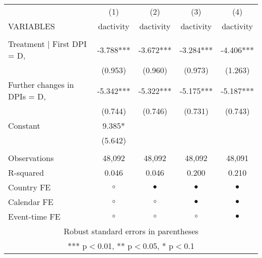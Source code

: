 \begin{tabular}{lcccc} \hline
 & (1) & (2) & (3) & (4) \\
VARIABLES & dactivity & dactivity & dactivity & dactivity \\ \hline
 &  &  &  &  \\
Treatment | First DPI = D, & -3.788*** & -3.672*** & -3.284*** & -4.406*** \\
 & (0.953) & (0.960) & (0.973) & (1.263) \\
Further changes in DPIs = D, & -5.342*** & -5.322*** & -5.175*** & -5.187*** \\
 & (0.744) & (0.746) & (0.731) & (0.743) \\
Constant & 9.385* &  &  &  \\
 & (5.642) &  &  &  \\
 &  &  &  &  \\
Observations & 48,092 & 48,092 & 48,092 & 48,091 \\
R-squared & 0.046 & 0.046 & 0.200 & 0.210 \\
Country FE & $ \circ $ & $ \bullet $ & $ \bullet $ & $ \bullet $ \\
Calendar FE & $ \circ $ & $ \circ $ & $ \bullet $ & $ \bullet $ \\
 Event-time FE & $ \circ $ & $ \circ $ & $ \circ $ & $ \bullet $ \\ \hline
\multicolumn{5}{c}{ Robust standard errors in parentheses} \\
\multicolumn{5}{c}{ *** p$<$0.01, ** p$<$0.05, * p$<$0.1} \\
\end{tabular}
